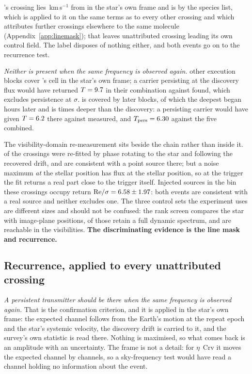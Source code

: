 \EvBStar{}'s crossing lies \EvBDv\,km\,s$^{-1}$ from \EvBLine{} in the star's
own frame and is \EvBDispo{} by the species list, which is applied to it on
the same terms as to every other crossing and which attributes further
crossings elsewhere to the same molecule (Appendix~\ref{app:linemask}); that
leaves
\NUnattrRankFlagged{} unattributed crossing leading its own control field.
The label disposes of nothing either, and both events go on to the recurrence
test.

\emph{Neither is present when the same frequency is observed again.}
\EvANRep{} other execution blocks cover \EvAStar{}'s cell in the star's own
frame; a carrier persisting at the discovery flux would have returned
$T=9.7$ in their combination against \EvATAnyDrift{} found, which
excludes persistence at \EvAExcl$\sigma$. \EvBStar{} is covered by \RcCpNRep{}
later blocks, of which the deepest began \EvBNearH\,hours later and is
\EvBDeepRatio{} times deeper than the discovery: a persisting carrier would
have given $T=6.2$ there against \EvBDeepTObs{} measured, and
$T_{\rm pers}=6.30$ against the five combined.

The visibility-domain re-measurement sits beside the chain rather than inside
it. \LgNFit{} of the \NCross{} crossings were re-fitted by phase rotating to
the star and following the recovered drift, and \LgNLocalCor{} are consistent
with a point source there; but a noise maximum \emph{at} the stellar position
has flux at the stellar position, so at the trigger the fit returns a real
part close to the trigger itself. Injected sources in the bin these crossings
occupy return ${\rm Re}/\sigma=6.58\pm1.97$: both
events are consistent with a real source and neither excludes one. The three
control sets the experiment uses are different sizes and should not be
confused: the rank screen compares the star with \NCtrl{} image-plane
positions, \RcNRetCtrl{} of those retain a full dynamic spectrum, and
\RcNVisCtrl{} are reachable in the visibilities.
\textbf{The discriminating evidence is the line mask and recurrence.}

\subsection{Recurrence, applied to every unattributed crossing}
\label{sec:etacrv}

\emph{A persistent transmitter should be there when the same frequency is
observed again.} That is the confirmation criterion, and it is applied in the
star's own frame: the expected channel follows from the Earth's motion at the
repeat epoch and the star's systemic velocity, the discovery drift is carried
to it, and the survey's own statistic is read there. Nothing is maximised, so
what comes back is an amplitude with an uncertainty. The frame is not a
detail: for $\eta$~Crv it moves the expected channel by \VnEcrDchan{}
channels, so a sky-frequency test would have read a channel holding no
information about the event.

